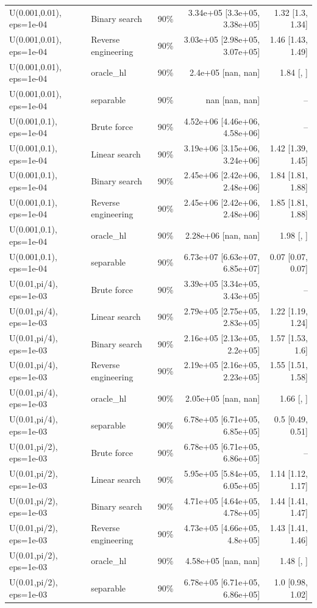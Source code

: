 \begin{tabular}{llrrr}
U(0.001,0.01), eps=1e-04 & Binary search & 90\% & 3.34e+05 [3.3e+05, 3.38e+05] & 1.32 [1.3, 1.34] \\
U(0.001,0.01), eps=1e-04 & Reverse engineering & 90\% & 3.03e+05 [2.98e+05, 3.07e+05] & 1.46 [1.43, 1.49] \\
U(0.001,0.01), eps=1e-04 & oracle_hl & 90\% & 2.4e+05 [nan, nan] & 1.84 [, ] \\
U(0.001,0.01), eps=1e-04 & separable & 90\% & nan [nan, nan] & -- \\
U(0.001,0.1), eps=1e-04 & Brute force & 90\% & 4.52e+06 [4.46e+06, 4.58e+06] & -- \\
U(0.001,0.1), eps=1e-04 & Linear search & 90\% & 3.19e+06 [3.15e+06, 3.24e+06] & 1.42 [1.39, 1.45] \\
U(0.001,0.1), eps=1e-04 & Binary search & 90\% & 2.45e+06 [2.42e+06, 2.48e+06] & 1.84 [1.81, 1.88] \\
U(0.001,0.1), eps=1e-04 & Reverse engineering & 90\% & 2.45e+06 [2.42e+06, 2.48e+06] & 1.85 [1.81, 1.88] \\
U(0.001,0.1), eps=1e-04 & oracle_hl & 90\% & 2.28e+06 [nan, nan] & 1.98 [, ] \\
U(0.001,0.1), eps=1e-04 & separable & 90\% & 6.73e+07 [6.63e+07, 6.85e+07] & 0.07 [0.07, 0.07] \\
U(0.01,pi/4), eps=1e-03 & Brute force & 90\% & 3.39e+05 [3.34e+05, 3.43e+05] & -- \\
U(0.01,pi/4), eps=1e-03 & Linear search & 90\% & 2.79e+05 [2.75e+05, 2.83e+05] & 1.22 [1.19, 1.24] \\
U(0.01,pi/4), eps=1e-03 & Binary search & 90\% & 2.16e+05 [2.13e+05, 2.2e+05] & 1.57 [1.53, 1.6] \\
U(0.01,pi/4), eps=1e-03 & Reverse engineering & 90\% & 2.19e+05 [2.16e+05, 2.23e+05] & 1.55 [1.51, 1.58] \\
U(0.01,pi/4), eps=1e-03 & oracle_hl & 90\% & 2.05e+05 [nan, nan] & 1.66 [, ] \\
U(0.01,pi/4), eps=1e-03 & separable & 90\% & 6.78e+05 [6.71e+05, 6.85e+05] & 0.5 [0.49, 0.51] \\
U(0.01,pi/2), eps=1e-03 & Brute force & 90\% & 6.78e+05 [6.71e+05, 6.86e+05] & -- \\
U(0.01,pi/2), eps=1e-03 & Linear search & 90\% & 5.95e+05 [5.84e+05, 6.05e+05] & 1.14 [1.12, 1.17] \\
U(0.01,pi/2), eps=1e-03 & Binary search & 90\% & 4.71e+05 [4.64e+05, 4.78e+05] & 1.44 [1.41, 1.47] \\
U(0.01,pi/2), eps=1e-03 & Reverse engineering & 90\% & 4.73e+05 [4.66e+05, 4.8e+05] & 1.43 [1.41, 1.46] \\
U(0.01,pi/2), eps=1e-03 & oracle_hl & 90\% & 4.58e+05 [nan, nan] & 1.48 [, ] \\
U(0.01,pi/2), eps=1e-03 & separable & 90\% & 6.78e+05 [6.71e+05, 6.86e+05] & 1.0 [0.98, 1.02] \\
\bottomrule
\end{tabular}
